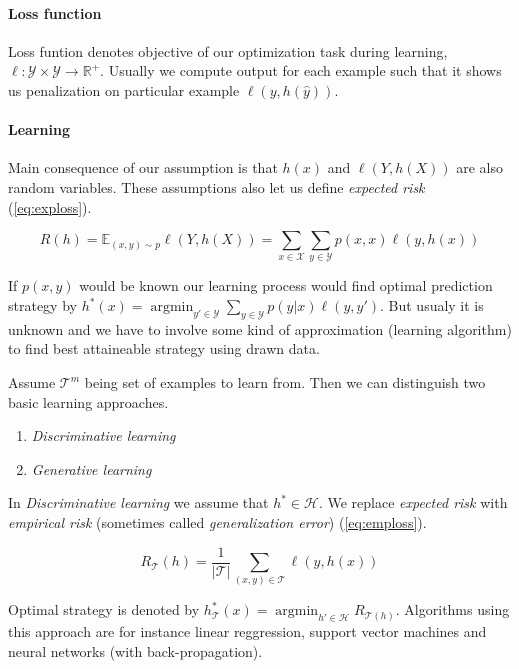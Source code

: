 \paragraph{Loss function}
Loss funtion denotes objective of our optimization task during learning, $\ell: \mathcal{Y} \times \mathcal{Y} \rightarrow \mathbb{R}^{+}$. Usually we compute output for each example such that it shows us penalization on particular example $\ell(y, h(\hat{y}))$.

\paragraph{Learning}
Main consequence of our assumption is that $h(x)$ and $\ell(Y,h(X))$ are also random variables. These assumptions also let us define \emph{expected risk} (\ref{eq:exploss}).

\begin{equation} \label{eq:exploss}
    R(h)=\mathbb{E}_{(x,y) \sim p}\ell(Y,h(X))=\sum_{x \in \mathcal{X}}\sum_{y \in \mathcal{Y}}p(x,x)\ell(y,h(x))
\end{equation}

If $p(x,y)$ would be known our learning process would find optimal prediction strategy by $h^*(x)=\operatorname*{argmin}_{{y}'\in \mathcal{Y}}\sum_{y\in\mathcal{Y}}p(y|x)\ell(y,{y}')$. But usualy it is unknown and we have to involve some kind of approximation (learning algorithm) to find best attaineable strategy using drawn data.

Assume $\mathcal{T}^m$ being set of examples to learn from. Then we can distinguish two basic learning approaches.
\begin{enumerate}
    \item \emph{Discriminative learning}
    \item \emph{Generative learning}
\end{enumerate}

In \emph{Discriminative learning} we assume that $h^* \in \mathcal{H}$. We replace \emph{expected risk} with \emph{empirical risk} (sometimes called \emph{generalization error}) (\ref{eq:emploss}).

\begin{equation} \label{eq:emploss}
    R_{\mathcal{T}}(h)= \frac{1}{|\mathcal{T}|} \sum_{(x,y) \in \mathcal
    T}\ell(y,h(x))
\end{equation}

Optimal strategy is denoted by $h_{\mathcal{T}}^*(x)=\operatorname*{argmin}_{{h}'\in \mathcal{H}}R_{\mathcal{T}(h)}$. Algorithms using this approach are for instance linear reggression, support vector machines and neural networks (with back-propagation).

